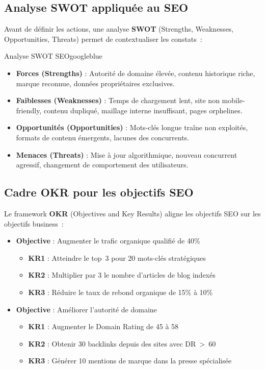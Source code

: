 \documentclass[12pt,a4paper,twoside]{report}
\newcommand{\keyword}[1]{\textbf{\textcolor{googleblue}{#1}}}
\begin{document}
\subsection{Analyse SWOT appliquée au SEO}

Avant de définir les actions, une analyse \keyword{SWOT} (Strengths, Weaknesses, Opportunities, Threats) permet de contextualiser les constats~:

\begin{mybox}{Analyse SWOT SEO}{googleblue}
\begin{itemize}
    \item \textbf{Forces (Strengths)} : Autorité de domaine élevée, contenu historique riche, marque reconnue, données propriétaires exclusives.
    \item \textbf{Faiblesses (Weaknesses)} : Temps de chargement lent, site non mobile-friendly, contenu dupliqué, maillage interne insuffisant, pages orphelines.
    \item \textbf{Opportunités (Opportunities)} : Mots-clés longue traîne non exploités, formats de contenu émergents, lacunes des concurrents.
    \item \textbf{Menaces (Threats)} : Mise à jour algorithmique, nouveau concurrent agressif, changement de comportement des utilisateurs.
\end{itemize}
\end{mybox}

\subsection{Cadre OKR pour les objectifs SEO}

Le framework \keyword{OKR} (Objectives and Key Results) aligne les objectifs SEO sur les objectifs business~:

\begin{itemize}
    \item \textbf{Objective} : Augmenter le trafic organique qualifié de 40\%
    \begin{itemize}
        \item \textbf{KR1} : Atteindre le top~3 pour 20 mots-clés stratégiques
        \item \textbf{KR2} : Multiplier par 3 le nombre d'articles de blog indexés
        \item \textbf{KR3} : Réduire le taux de rebond organique de 15\% à 10\%
    \end{itemize}
    \item \textbf{Objective} : Améliorer l'autorité de domaine
    \begin{itemize}
        \item \textbf{KR1} : Augmenter le Domain Rating de 45 à 58
        \item \textbf{KR2} : Obtenir 30 backlinks depuis des sites avec DR~>~60
        \item \textbf{KR3} : Générer 10 mentions de marque dans la presse spécialisée
    \end{itemize}
\end{itemize}
\end{document}
